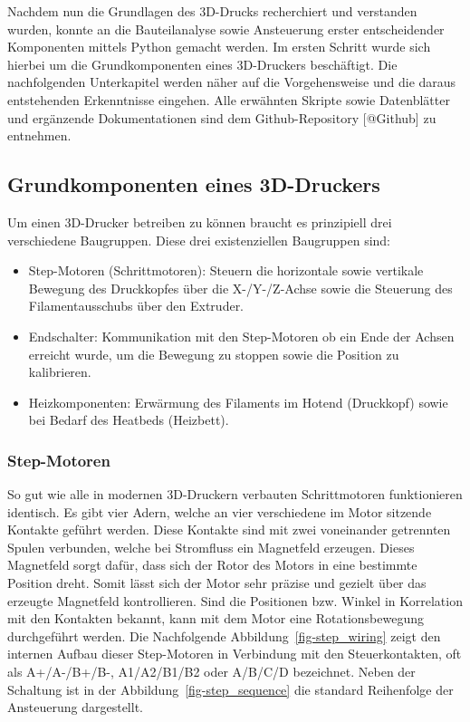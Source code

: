 \documentclass[
  ngerman,
  titlepage=true,
  listof=totoc]{scrartcl}
\providecommand{\tightlist}{%
  \setlength{\itemsep}{0pt}\setlength{\parskip}{0pt}}
\begin{document}
\tableofcontents
\clearpage
\listoffigures
\listoftables

Nachdem nun die Grundlagen des 3D-Drucks recherchiert und verstanden
wurden, konnte an die Bauteilanalyse sowie Ansteuerung erster
entscheidender Komponenten mittels Python gemacht werden. Im ersten
Schritt wurde sich hierbei um die Grundkomponenten eines 3D-Druckers
beschäftigt. Die nachfolgenden Unterkapitel werden näher auf die
Vorgehensweise und die daraus entstehenden Erkenntnisse eingehen. Alle
erwähnten Skripte sowie Datenblätter und ergänzende Dokumentationen sind
dem Github-Repository {[}@Github{]} zu entnehmen.

\subsection{Grundkomponenten eines
3D-Druckers}\label{grundkomponenten-eines-3d-druckers}

Um einen 3D-Drucker betreiben zu können braucht es prinzipiell drei
verschiedene Baugruppen. Diese drei existenziellen Baugruppen sind:

\begin{itemize}
\tightlist
\item
  Step-Motoren (Schrittmotoren): Steuern die horizontale sowie vertikale
  Bewegung des Druckkopfes über die X-/Y-/Z-Achse sowie die Steuerung
  des Filamentausschubs über den Extruder.
\item
  Endschalter: Kommunikation mit den Step-Motoren ob ein Ende der Achsen
  erreicht wurde, um die Bewegung zu stoppen sowie die Position zu
  kalibrieren.
\item
  Heizkomponenten: Erwärmung des Filaments im Hotend (Druckkopf) sowie
  bei Bedarf des Heatbeds (Heizbett).
\end{itemize}

\subsubsection{Step-Motoren}\label{sec-step}

So gut wie alle in modernen 3D-Druckern verbauten Schrittmotoren
funktionieren identisch. Es gibt vier Adern, welche an vier verschiedene
im Motor sitzende Kontakte geführt werden. Diese Kontakte sind mit zwei
voneinander getrennten Spulen verbunden, welche bei Stromfluss ein
Magnetfeld erzeugen. Dieses Magnetfeld sorgt dafür, dass sich der Rotor
des Motors in eine bestimmte Position dreht. Somit lässt sich der Motor
sehr präzise und gezielt über das erzeugte Magnetfeld kontrollieren.
Sind die Positionen bzw. Winkel in Korrelation mit den Kontakten
bekannt, kann mit dem Motor eine Rotationsbewegung durchgeführt werden.
Die Nachfolgende Abbildung~\ref{fig-step_wiring} zeigt den internen
Aufbau dieser Step-Motoren in Verbindung mit den Steuerkontakten, oft
als A+/A-/B+/B-, A1/A2/B1/B2 oder A/B/C/D bezeichnet. Neben der
Schaltung ist in der Abbildung~\ref{fig-step_sequence} die standard
Reihenfolge der Ansteuerung dargestellt.
\end{document}

